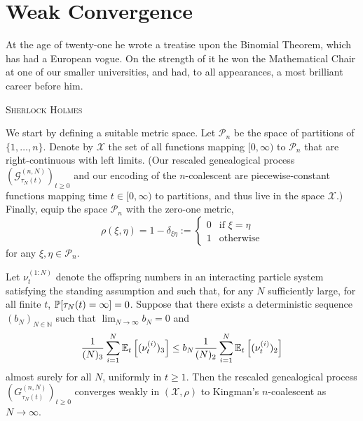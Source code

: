 \chapter{Weak Convergence \seb{$\checkmark$} }

\epigraph{
At the age of twenty-one he wrote a treatise upon the Binomial Theorem, which has had a European vogue. On the strength of it he won the Mathematical Chair at one of our smaller universities, and had, to all appearances, a most brilliant career before him.
}
{\textsc{Sherlock Holmes}} %


We start by defining a suitable metric space.
Let $\mathcal{P}_n$ be the space of partitions of $\{1,\dots,n\}$.
Denote by $\mathcal{X}$ the set of all functions mapping $[0,\infty)$ to $\mathcal{P}_n$ that are right-continuous with left limits.
(Our rescaled genealogical process $(\mathcal{G}^{(n,N)}_{\tau_N(t)})_{t\geq0}$ and our encoding of the $n$-coalescent are piecewise-constant functions mapping time $t\in[0,\infty)$ to partitions, and thus live in the space $\mathcal{X}$.)
Finally, equip the space $\mathcal{P}_n$ with the zero-one metric,
\begin{equation}
\rho(\xi,\eta) 
= 1- \delta_{\xi\eta} 
:= \begin{cases}
    0 &\text{if } \xi=\eta \\
    1 &\text{otherwise}
\end{cases}
\end{equation}
for any $\xi, \eta \in \mathcal{P}_n$.


\begin{theorem}\label{thm:weakconv}
Let $\nu_t^{(1:N)}$ denote the offspring numbers in an interacting particle system satisfying the standing assumption and such that, for any $N$ sufficiently large, for all finite $t$, $\mathbb{P}[ \tau_N(t) = \infty ] =0$. Suppose that there exists a deterministic sequence $(b_N)_{N\in\mathbb{N}}$ such that ${\lim}_{N\to\infty} b_N =0$ and%
\begin{equation}\label{eq:mainthmcondition2}
\frac{1}{(N)_3} \sum_{i = 1}^N \mathbb{E}_t\left[ (\nu_t^{(i)})_3 \right]  \leq b_N \frac{1}{(N)_2} \sum_{i = 1}^N \mathbb{E}_t\left[ (\nu_t^{(i)})_2 \right]
\end{equation}
almost surely for all $N$, uniformly in $t \geq 1$.
Then the rescaled genealogical process $(G_{\tau_N(t)}^{(n,N)})_{t\geq0}$ converges weakly in $(\mathcal{X}, \rho)$
to Kingman's $n$-coalescent as $N \to \infty$.
\end{theorem}

